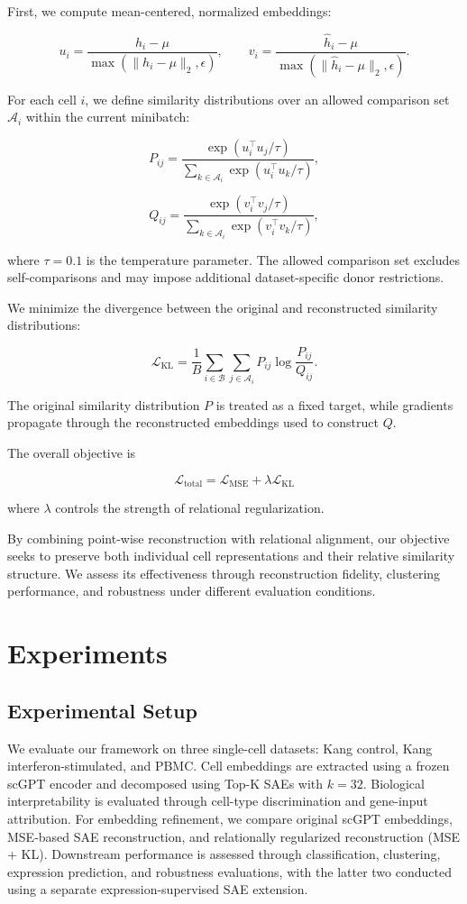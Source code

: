 \documentclass{article}
\begin{document}
First, we compute mean-centered, normalized embeddings:

\[
u_i=\frac{h_i-\mu}
{\max(\|h_i-\mu\|_2,\epsilon)},
\qquad
v_i=\frac{\hat h_i-\mu}
{\max(\|\hat h_i-\mu\|_2,\epsilon)}.
\]

For each cell \(i\), we define similarity distributions over an allowed comparison set \(\mathcal A_i\) within the current minibatch:

\[
P_{ij}
=
\frac{\exp(u_i^\top u_j/\tau)}
{\sum_{k\in\mathcal A_i}\exp(u_i^\top u_k/\tau)},
\]

\[
Q_{ij}
=
\frac{\exp(v_i^\top v_j/\tau)}
{\sum_{k\in\mathcal A_i}\exp(v_i^\top v_k/\tau)},
\]

where \(\tau=0.1\) is the temperature parameter. The allowed comparison set excludes self-comparisons and may impose additional dataset-specific donor restrictions.

We minimize the divergence between the original and reconstructed similarity distributions:

\[
\mathcal L_{\mathrm{KL}}
=
\frac{1}{B}
\sum_{i\in\mathcal B}
\sum_{j\in\mathcal A_i}
P_{ij}\log\frac{P_{ij}}{Q_{ij}}.
\]

The original similarity distribution \(P\) is treated as a fixed target, while gradients propagate through the reconstructed embeddings used to construct \(Q\).

The overall objective is

\[
\boxed{
\mathcal L_{\mathrm{total}}
=
\mathcal L_{\mathrm{MSE}}
+
\lambda\mathcal L_{\mathrm{KL}}
}
\]

where \(\lambda\) controls the strength of relational regularization.

By combining point-wise reconstruction with relational alignment, our objective seeks to preserve both individual cell representations and their relative similarity structure. We assess its effectiveness through reconstruction fidelity, clustering performance, and robustness under different evaluation conditions.

\section{Experiments}
\label{sec:experiments}

\subsection{Experimental Setup}

We evaluate our framework on three single-cell datasets: Kang control, Kang interferon-stimulated, and PBMC. Cell embeddings are extracted using a frozen scGPT encoder and decomposed using Top-K SAEs with $k=32$. Biological interpretability is evaluated through cell-type discrimination and gene-input attribution. For embedding refinement, we compare original scGPT embeddings, MSE-based SAE reconstruction, and relationally regularized reconstruction (MSE + KL). Downstream performance is assessed through classification, clustering, expression prediction, and robustness evaluations, with the latter two conducted using a separate expression-supervised SAE extension.
\end{document}

